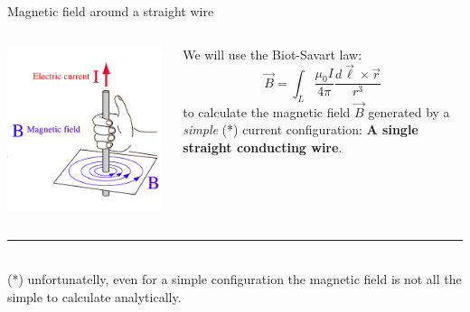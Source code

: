 %
%
%

\begin{frame}{Magnetic field around a straight wire}

\begin{columns}
  \begin{column}{0.50\textwidth}
    \includegraphics[width=0.98\textwidth]{./images/schematics/magnetic_field_around_wire_01.png}
  \end{column}
  \begin{column}{0.50\textwidth}
    We will use the Biot-Savart law:
    \begin{equation*}
       \vec{B} = \int_{L} \frac{\mu_0I}{4\pi} \frac{d\vec{\ell} \times \vec{r}}{r^3}
      \end{equation*}
      to calculate the magnetic field $\vec{B}$
      generated by a {\em simple} (*) current configuration:
      {\bf A single straight conducting wire}.
  \end{column}
\end{columns}

 \noindent\rule{2cm}{0.4pt}\\
 {\scriptsize
   (*) unfortunatelly, even for a simple configuration the magnetic field is not all the simple to calculate analytically.\\
 }

\end{frame}

